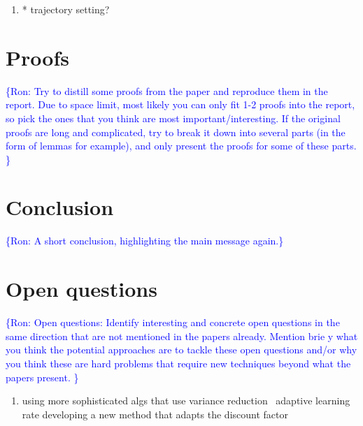 \documentclass{article}
\newcommand{\ra}[1]{\textcolor{blue}{\{Ron: #1\}}}
\begin{document}
\begin{enumerate}
    \item  * trajectory setting?
\end{enumerate}

\section{Proofs}

\ra{
Try to distill some proofs from the paper and reproduce them in the report. Due to
space limit, most likely you can only fit 1-2 proofs into the report, so pick the ones that you
think are most important/interesting. If the original proofs are long and complicated, try to
break it down into several parts (in the form of lemmas for example), and only present the
proofs for some of these parts.
}

\section{Conclusion}
\ra{A short conclusion, highlighting the main message again.}

\section{Open questions}
\ra{
Open questions: Identify interesting and concrete open questions in the same direction that
are not mentioned in the papers already. Mention brie
y what you think the potential
approaches are to tackle these open questions and/or why you think these are hard
problems that require new techniques beyond what the papers present.
}
\begin{enumerate}
    \item using more sophisticated algs that use variance reduction \ adaptive learning rate
developing a new method that adapts the discount factor
\end{enumerate}





\end{document}
